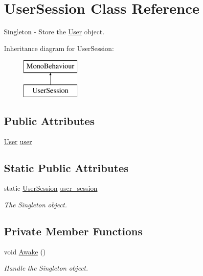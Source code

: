 \hypertarget{class_user_session}{}\section{User\+Session Class Reference}
\label{class_user_session}


Singleton -\/ Store the \mbox{\hyperlink{class_user}{User}} object.  


Inheritance diagram for User\+Session\+:\begin{figure}[H]
\begin{center}
\leavevmode
\includegraphics[height=2.000000cm]{class_user_session}
\end{center}
\end{figure}
\subsection*{Public Attributes}
\begin{DoxyCompactItemize}
\item 
\mbox{\hyperlink{class_user}{User}} \mbox{\hyperlink{class_user_session_ac49138881aafd0ea64d7e73b1beb7eb5}{user}}
\end{DoxyCompactItemize}
\subsection*{Static Public Attributes}
\begin{DoxyCompactItemize}
\item 
static \mbox{\hyperlink{class_user_session}{User\+Session}} \mbox{\hyperlink{class_user_session_aa2651c5c9a3108e8a545c100a16387a1}{user\+\_\+session}}
\begin{DoxyCompactList}\small\item\em The Singleton object. \end{DoxyCompactList}\end{DoxyCompactItemize}
\subsection*{Private Member Functions}
\begin{DoxyCompactItemize}
\item 
void \mbox{\hyperlink{class_user_session_af727750c85b37856babe7fa27886aaab}{Awake}} ()
\begin{DoxyCompactList}\small\item\em Handle the Singleton object. \end{DoxyCompactList}\end{DoxyCompactItemize}


